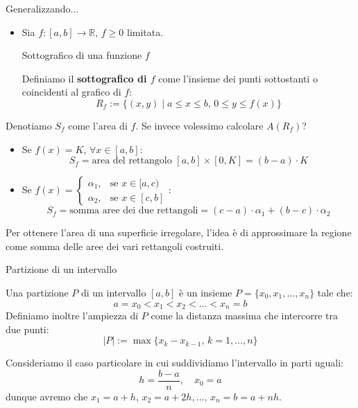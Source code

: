 \documentclass[12pt]{report}
\newcommand{\R}{\mathbb{R}}
\begin{document}
	Generalizzando...
	\begin{itemize}
		
		\item Sia $f: [a, b] \to \R$, $f \geq 0$ limitata.
		\begin{definizione}{Sottografico di una funzione $f$}{}
			
			Definiamo il \textbf{sottografico di $f$} come l'insieme dei punti sottostanti o coincidenti al grafico di $f$:
			\[
			R_f := \{(x, y) \mid a \leq x \leq b, \, 0 \leq y \leq f(x)\}
			\]
			
		\end{definizione}
		
	\end{itemize}
	
	Denotiamo $S_f$ come l'area di $f$. Se invece volessimo calcolare $A(R_f)$?
	\begin{itemize}
		
		\item Se $f(x) = K$, $\forall x \in [a, b]$:
		\[
		S_f = \text{area del rettangolo } [a, b] \times [0, K] = (b - a) \cdot K
		\]
		
		\item Se $f(x) = \begin{cases} \alpha_1, & \text{se } x \in [a, c) \\ \alpha_2, & \text{se } x \in [c, b] \end{cases}$:
		\[
		S_f = \text{somma aree dei due rettangoli} = (c - a) \cdot \alpha_1 + (b - c) \cdot \alpha_2
		\]
		
	\end{itemize}
	
	Per ottenere l'area di una superficie irregolare, l'idea è di approssimare la regione come somma delle aree dei vari rettangoli costruiti.
	
	\begin{definizione}{Partizione di un intervallo}{}
		
		Una partizione $P$ di un intervallo $[a, b]$ è un insieme $P = \{x_0, x_1, \dots, x_n\}$ tale che:
		\[
		a = x_0 < x_1 < x_2 < \dots < x_n = b
		\]
		Definiamo inoltre l'ampiezza di $P$ come la distanza massima che intercorre tra due punti:
		\[
		|P| := \max\{x_k - x_{k-1}, \, k = 1, \dots, n\}
		\]
		
	\end{definizione}
	
	\begin{osservazione}{}{}
		
		Consideriamo il caso particolare in cui suddividiamo l'intervallo in parti uguali:
		\[
		h = \frac{b-a}{n}, \quad x_0 = a
		\]
		dunque avremo che $x_1 = a + h,\, x_2 = a + 2h, \dots,\, x_n = b = a + nh$.
		
	\end{osservazione}
	
\end{document}

